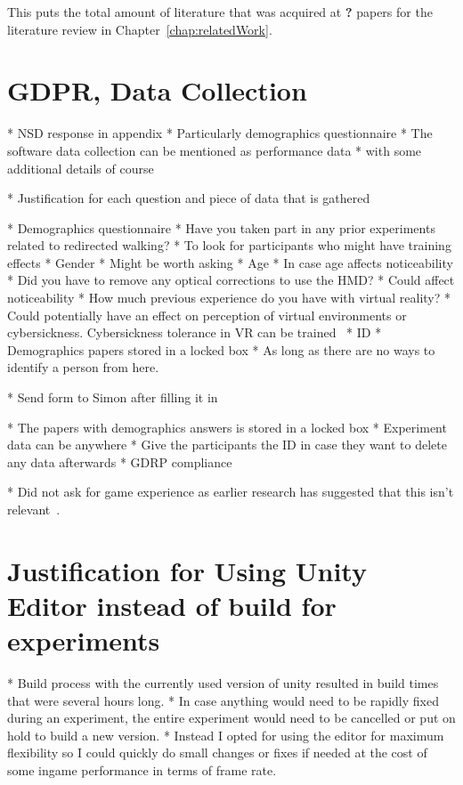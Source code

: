This puts the total amount of literature that was acquired at \textbf{?} papers for the literature review in Chapter~\ref{chap:relatedWork}.

\section{GDPR, Data Collection}
* NSD response in appendix
* Particularly demographics questionnaire
* The software data collection can be mentioned as performance data
   * with some additional details of course
   
* Justification for each question and piece of data that is gathered

* Demographics questionnaire
   * Have you taken part in any prior experiments related to redirected walking?
      * To look for participants who might have training effects 
   * Gender
      * Might be worth asking
   * Age
      * In case age affects noticeability
   * Did you have to remove any optical corrections to use the HMD?
      * Could affect noticeability
   * How much previous experience do you have with virtual reality?
      * Could potentially have an effect on perception of virtual environments or cybersickness. Cybersickness tolerance in VR can be trained~\cite{hildebrandt2018get}
   * ID
      * Demographics papers stored in a locked box
   * As long as there are no ways to identify a person from here. 

* Send form to Simon after filling it in

* The papers with demographics answers is stored in a locked box 
* Experiment data can be anywhere
* Give the participants the ID in case they want to delete any data afterwards
   * GDRP compliance

* Did not ask for game experience as earlier research has suggested that this isn't relevant~\cite{nguyen2018individual}.

\section{Justification for Using Unity Editor instead of build for experiments}
* Build process with the currently used version of unity resulted in build times that were several hours long.
* In case anything would need to be rapidly fixed during an experiment, the entire experiment would need to be cancelled or put on hold to build a new version. 
* Instead I opted for using the editor for maximum flexibility so I could quickly do small changes or fixes if needed at the cost of some ingame performance in terms of frame rate. 